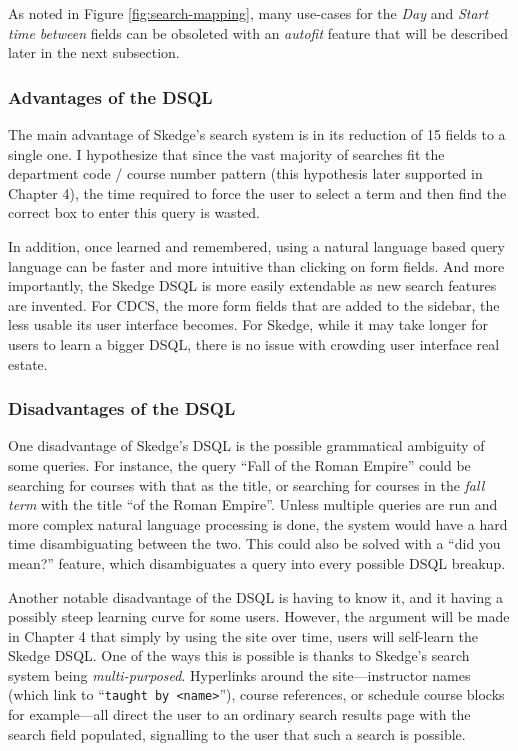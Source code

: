 \doublespacing

\noindent As noted in Figure \ref{fig:search-mapping}, many use-cases for the \emph{Day} and \emph{Start time between} fields can be obsoleted with an \emph{autofit} feature that will be described later in the next subsection.

  \subsubsection{Advantages of the DSQL}

    The main advantage of Skedge's search system is in its reduction of 15 fields to a single one. I hypothesize that since the vast majority of searches fit the department code / course number pattern (this hypothesis later supported in Chapter 4), the time required to force the user to select a term and then find the correct box to enter this query is wasted.

    In addition, once learned and remembered, using a natural language based query language can be faster and more intuitive than clicking on form fields. And more importantly, the Skedge DSQL is more easily extendable as new search features are invented. For CDCS, the more form fields that are added to the sidebar, the less usable its user interface becomes. For Skedge, while it may take longer for users to learn a bigger DSQL, there is no issue with crowding user interface real estate.
  
  \subsubsection{Disadvantages of the DSQL}

    One disadvantage of Skedge's DSQL is the possible grammatical ambiguity of some queries. For instance, the query ``Fall of the Roman Empire'' could be searching for courses with that as the title, or searching for courses in the \emph{fall term} with the title ``of the Roman Empire''. Unless multiple queries are run and more complex natural language processing is done, the system would have a hard time disambiguating between the two. This could also be solved with a ``did you mean?'' feature, which disambiguates a query into every possible DSQL breakup.
    
    Another notable disadvantage of the DSQL is having to know it, and it having a possibly steep learning curve for some users. However, the argument will be made in Chapter 4 that simply by using the site over time, users will self-learn the Skedge DSQL. One of the ways this is possible is thanks to Skedge's search system being \emph{multi-purposed}. Hyperlinks around the site---instructor names (which link to ``{\tt taught by <name>}''), course references, or schedule course blocks for example---all direct the user to an ordinary search results page with the search field populated, signalling to the user that such a search is possible.


